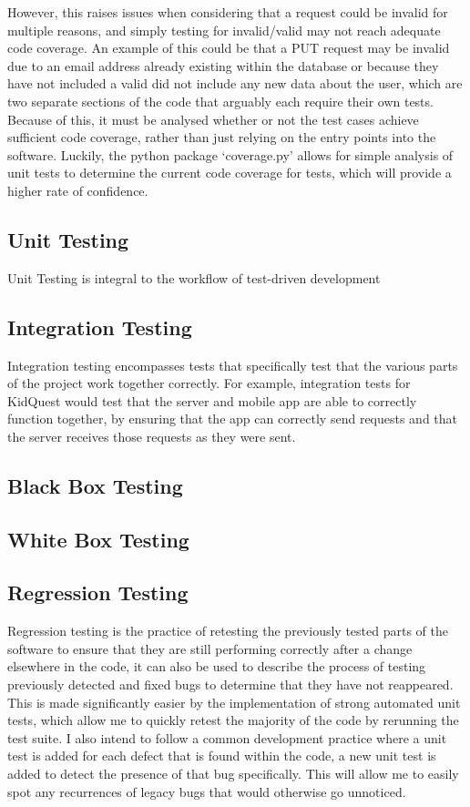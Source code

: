 However, this raises issues when considering that a request could be invalid for multiple reasons, and simply testing for invalid/valid may not reach adequate code coverage.
An example of this could be that a PUT request may be invalid due to an email address already existing within the database or because they have not included a valid did not include any new data about the user, which are two separate sections of the code that arguably each require their own tests.
Because of this, it must be analysed whether or not the test cases achieve sufficient code coverage, rather than just relying on the entry points into the software.
Luckily, the python package `coverage.py' allows for simple analysis of unit tests to determine the current code coverage for tests, which will provide a higher rate of confidence.

\subsection{Unit Testing} 
Unit Testing is integral to the workflow of test-driven development

\subsection{Integration Testing}
Integration testing encompasses tests that specifically test that the various parts of the project work together correctly.
For example, integration tests for KidQuest would test that the server and mobile app are able to correctly function together, by ensuring that the app can correctly send requests and that the server receives those requests as they were sent.


\subsection{Black Box Testing}

\subsection{White Box Testing}


\subsection{Regression Testing}
Regression testing is the practice of retesting the previously tested parts of the software to ensure that they are still performing correctly after a change elsewhere in the code, it can also be used to describe the process of testing previously detected and fixed bugs to determine that they have not reappeared.
This is made significantly easier by the implementation of strong automated unit tests, which allow me to quickly retest the majority of the code by rerunning the test suite.
I also intend to follow a common development practice where a unit test is added for each defect that is found within the code, a new unit test is added to detect the presence of that bug specifically. 
This will allow me to easily spot any recurrences of legacy bugs that would otherwise go unnoticed.

